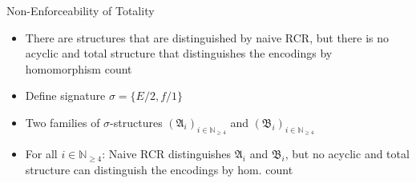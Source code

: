 \documentclass[aspectratio=169]{beamer}
\begin{document}
	\begin{frame}{Non-Enforceability of Totality}
		\begin{itemize}
			\item There are structures that are distinguished by naive RCR, but there is no acyclic and total structure that distinguishes the encodings by homomorphism count
			\item Define signature $\sigma=\{E/2,f/1\}$
			\item Two families of $\sigma$-structures $(\mathfrak A_i)_{i\in\mathbb N_{\geq 4}}$ and $(\mathfrak B_i)_{i\in\mathbb N_{\geq 4}}$
			\item For all $i\in \mathbb N_{\geq 4}$: Naive RCR distinguishes $\mathfrak A_i$ and $\mathfrak B_i$, but no acyclic and total structure can distinguish the encodings by hom. count
		\end{itemize}
	\end{frame}
	
\end{document}
